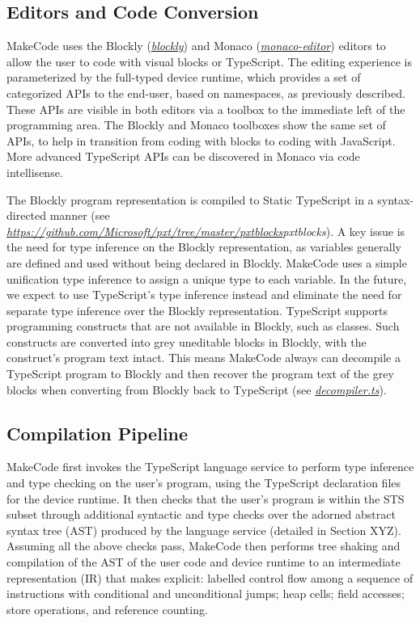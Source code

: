 \subsection{Editors and Code Conversion}

MakeCode uses the Blockly (\emph{\href{https://github.com/google/blockly}{blockly}}) and Monaco 
(\emph{\href{https://github.com/Microsoft/monaco-editor}{monaco-editor}}) editors to allow the user to code with
visual blocks or TypeScript. The editing experience is parameterized by the full-typed device
runtime, which provides a set of categorized APIs to the end-user, based on namespaces, as
previously described. These APIs are visible in both editors via a toolbox to the immediate
left of the programming area. The Blockly and Monaco toolboxes show the same set of APIs, to
help in transition from coding with blocks to coding with JavaScript. More advanced TypeScript
APIs can be discovered in Monaco via code intellisense.

The Blockly program representation is compiled to Static TypeScript in a syntax-directed manner
(see \emph{\url{https://github.com/Microsoft/pxt/tree/master/pxtblocks}{pxtblocks}}). A key issue is the need for
type inference on the Blockly representation, as variables generally are defined and used without
being declared in Blockly. MakeCode uses a simple unification type inference to assign a
unique type to each variable.  In the future, we expect to use TypeScript's type inference instead
and eliminate the need for separate type inference over the Blockly representation. 
TypeScript supports programming constructs that are not available in Blockly, such as classes.
Such constructs are converted into grey uneditable blocks in Blockly, with the construct's program
text intact. This means MakeCode always can decompile a TypeScript program to Blockly and then recover
the program text of the grey blocks when converting from Blockly back to TypeScript
 (see \emph{\href{https://github.com/Microsoft/pxt/blob/master/pxtcompiler/emitter/decompiler.ts}{decompiler.ts}}). 

\subsection{Compilation Pipeline}

MakeCode first invokes the TypeScript language service to perform type inference and type checking on the 
user's program, using the TypeScript declaration files for the device runtime.   It then checks that the
user's program is within the STS subset through additional syntactic and type checks over the adorned
abstract syntax tree (AST) produced by the language service (detailed in Section XYZ).  Assuming all the
above checks pass, MakeCode then performs tree shaking and compilation of the AST of the user code and
device runtime to an intermediate representation (IR) that makes explicit: labelled control flow among a
sequence of instructions with conditional and unconditional jumps; heap cells; field accesses; store operations,
and reference counting.

